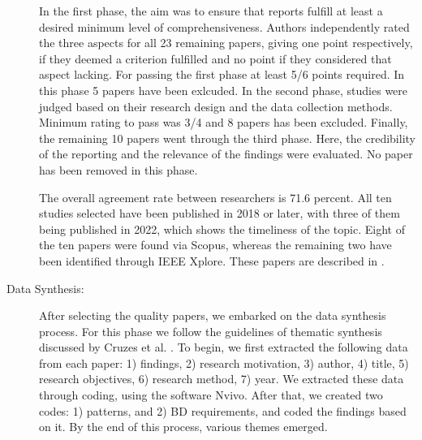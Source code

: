 \documentclass[a4paper,11pt,article,oneside]{memoir}
\begin{document}
\begin{description}
    
    
    In the first phase, the aim was to ensure that reports fulfill at least a desired minimum level of comprehensiveness. Authors independently rated the three aspects for all 23 remaining papers, giving one point respectively, if they deemed a criterion fulfilled and no point if they considered that aspect lacking. For passing the first phase at least 5/6 points required. In this phase 5 papers have been exlcuded. In the second phase, studies were judged based on their research design and the data collection methods. Minimum rating to pass was 3/4 and 8 papers has been excluded. Finally, the remaining 10 papers went through the third phase. Here, the credibility of the reporting and the relevance of the findings were evaluated. No paper has been removed in this phase.
    
    The overall agreement rate between researchers is 71.6 percent. All ten studies selected have been published in 2018 or later, with three of them being published in 2022, which shows the timeliness of the topic. Eight of the ten papers were found via Scopus, whereas the remaining two have been identified through IEEE Xplore. These papers are described in \citet{foundPapers}.

    \item[Data Synthesis:] After selecting the quality papers, we embarked on the data synthesis process. For this phase we follow the guidelines of thematic synthesis discussed by Cruzes et al. \citet{Cruzes.2011}. To begin, we first extracted the following data from each paper: 1) findings, 2) research motivation, 3) author, 4) title, 5) research objectives, 6) research method, 7) year. We extracted these data through coding, using the software Nvivo. After that, we created two codes: 1) patterns, and 2) BD requirements, and coded the findings based on it. By the end of this process, various themes emerged. 
    
\end{description}

\end{document}
